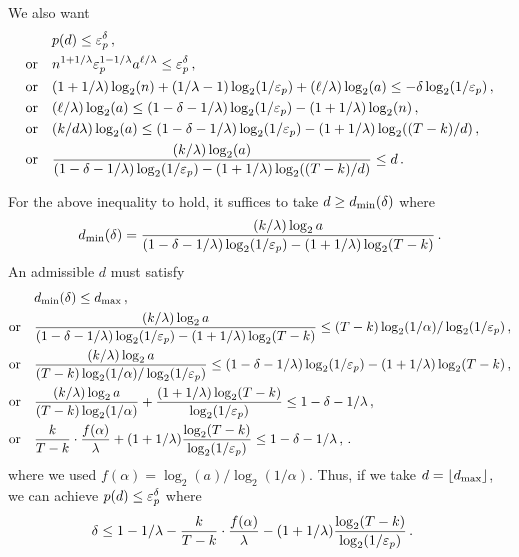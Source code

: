   We also want 
  \begin{align*}
    &p(d) \leq \mathsf{\varepsilon}_p^{\delta}\,,\\
    \text{or}\quad &
      n^{1+1/\lambda} \mathsf{\varepsilon}_p^{1 - 1/\lambda} a^{\ell/\lambda} \leq \mathsf{\varepsilon}_p^\delta \,,\\
    \text{or}\quad &
      (1+1/\lambda)\log_2(n)
      + (1/\lambda - 1)\log_2(1/\mathsf{\varepsilon}_p) 
      + (\ell/\lambda) \log_2(a) \leq -\delta \log_2(1/\mathsf{\varepsilon}_p) \,,\\
    \text{or}\quad &      
      (\ell/\lambda) \log_2(a) \leq (1-\delta - 1/\lambda) \log_2(1/\mathsf{\varepsilon}_p) - (1+1/\lambda)\log_2(n)\,,\\
    \text{or}\quad &      
      (k/d\lambda) \log_2(a) \leq (1-\delta - 1/\lambda) \log_2(1/\mathsf{\varepsilon}_p) - (1+1/\lambda)\log_2((T-k)/d)\,,\\
    \text{or}\quad &      
      \frac{(k/\lambda) \log_2(a)}{(1-\delta - 1/\lambda) \log_2(1/\mathsf{\varepsilon}_p) - (1+1/\lambda)\log_2((T-k)/d)} \leq d
      \,.
  \end{align*}
  
  For the above inequality to hold, 
  it suffices to take $d \geq d_\mathrm{min}(\delta)$ where 
  $$
    d_\mathrm{min}(\delta) = \frac{(k/\lambda) \log_2 a}{(1 - \delta - 1/\lambda) \log_2(1/\mathsf{\varepsilon}_p) - (1+1/\lambda) \log_2(T - k)}
    \,.
  $$
  An admissible $d$ must satisfy
  \begin{align*}
    &d_\mathrm{min}(\delta) \leq d_\mathrm{max} \,,\\
    \text{or}\quad &      
      \frac{(k/\lambda) \log_2 a}{(1 - \delta - 1/\lambda) \log_2(1/\mathsf{\varepsilon}_p) - (1+1/\lambda) \log_2(T - k)}
        \leq (T - k) \log_2(1/\alpha)/\log_2(1/\mathsf{\varepsilon}_p) \,,\\
    \text{or}\quad &      
      \frac{(k/\lambda) \log_2 a}{(T - k) \log_2(1/\alpha)/\log_2(1/\mathsf{\varepsilon}_p)} 
        \leq (1 - \delta - 1/\lambda) \log_2(1/\mathsf{\varepsilon}_p) - (1+1/\lambda) \log_2(T - k) \,,\\
    \text{or}\quad &      
      \frac{(k/\lambda) \log_2 a}{(T - k) \log_2(1/\alpha)} + \frac{(1+1/\lambda) \log_2(T - k)}{\log_2(1/\mathsf{\varepsilon}_p)}
        \leq 1 - \delta - 1/\lambda  \,,\\
    \text{or}\quad &      
      \frac{k}{T-k}\cdot \frac{f(\alpha)}{\lambda} + (1+1/\lambda) \frac{ \log_2(T - k)}{\log_2(1/\mathsf{\varepsilon}_p)}
        \leq 1 - \delta - 1/\lambda  \,,
        \,.
  \end{align*}
  where we used $f(\alpha) = \log_2(a)/\log_2(1/\alpha)$. 
  Thus, if we take $d = \lfloor d_\mathrm{max} \rfloor$, we can achieve  $p(d) \leq \mathsf{\varepsilon}_p^{\delta}$ 
  where 
  \begin{align}
    \delta
      &\leq 1 - 1/\lambda - \frac{k}{T-k}\cdot \frac{f(\alpha)}{\lambda} - (1+1/\lambda) \frac{ \log_2(T - k)}{\log_2(1/\mathsf{\varepsilon}_p)}\,. \label{eq:delta}    
  \end{align}


